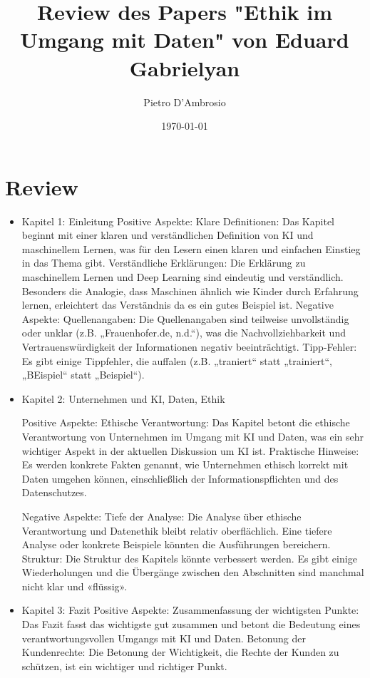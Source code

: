 \documentclass{article}
\title{Review des Papers "Ethik im Umgang mit Daten" von Eduard Gabrielyan}
\author{Pietro D'Ambrosio}
\date{\today}
\begin{document}
\maketitle


\section{Review}

\begin{itemize}
\item Kapitel 1: Einleitung
Positive Aspekte:
Klare Definitionen: Das Kapitel beginnt mit einer klaren und verständlichen Definition von KI und maschinellem Lernen, was für den Lesern einen klaren und einfachen Einstieg in das Thema gibt.
Verständliche Erklärungen: Die Erklärung zu maschinellem Lernen und Deep Learning sind eindeutig und verständlich. Besonders die Analogie, dass Maschinen ähnlich wie Kinder durch Erfahrung lernen, erleichtert das Verständnis da es ein gutes Beispiel ist.
Negative Aspekte:
Quellenangaben: Die Quellenangaben sind teilweise unvollständig oder unklar (z.B. „Frauenhofer.de, n.d.“), was die Nachvollziehbarkeit und Vertrauenswürdigkeit der Informationen negativ beeinträchtigt.
Tipp-Fehler: Es gibt einige Tippfehler, die auffalen (z.B. „traniert“ statt „trainiert“, „BEispiel“ statt „Beispiel“).

\item Kapitel 2: Unternehmen und KI, Daten, Ethik 
   
Positive Aspekte: 
Ethische Verantwortung: Das Kapitel betont die ethische Verantwortung von Unternehmen im Umgang mit KI und Daten, was ein sehr wichtiger Aspekt in der aktuellen Diskussion um KI ist.
Praktische Hinweise: Es werden konkrete Fakten genannt, wie Unternehmen ethisch korrekt mit Daten umgehen können, einschließlich der Informationspflichten und des Datenschutzes.

Negative Aspekte:
Tiefe der Analyse: Die Analyse über ethische Verantwortung und Datenethik bleibt relativ oberflächlich. Eine tiefere Analyse oder konkrete Beispiele könnten die Ausführungen bereichern.
Struktur: Die Struktur des Kapitels könnte verbessert werden. Es gibt einige Wiederholungen und die Übergänge zwischen den Abschnitten sind manchmal nicht klar und «flüssig».

\item Kapitel 3: Fazit
Positive Aspekte:
Zusammenfassung der wichtigsten Punkte: Das Fazit fasst das wichtigste gut zusammen und betont die Bedeutung eines verantwortungsvollen Umgangs mit KI und Daten.
Betonung der Kundenrechte: Die Betonung der Wichtigkeit, die Rechte der Kunden zu schützen, ist ein wichtiger und richtiger Punkt.


\end{itemize}
\end{document}
